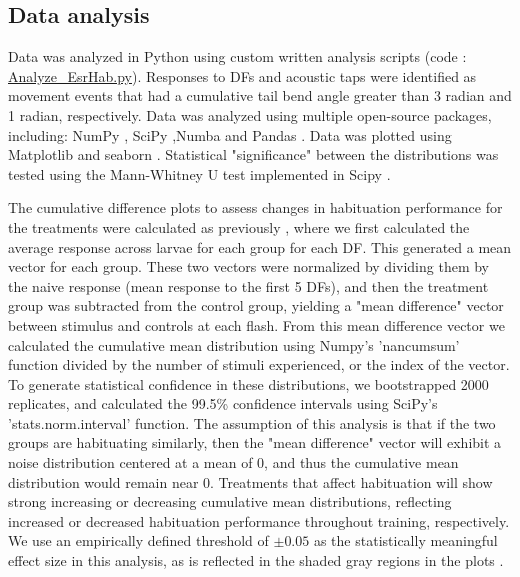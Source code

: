 \documentclass[9pt,lineno]{RandlettLab_elife}
\begin{document}
{\subsection{Data analysis}

Data was analyzed in Python using custom written analysis scripts (code : \href{https://github.com/owenrandlett/2025_HabEstrogen/blob/main/code/Analyze_EsrHab.py}{Analyze\_EsrHab.py}). 
Responses to DFs and acoustic taps were identified as movement events that had a cumulative tail bend angle greater than 3 radian and 1 radian, respectively. Data was analyzed using multiple open-source packages, including: NumPy \citep{Harris2020-bg}, SciPy \citep{Virtanen2020-sz},Numba \citep{lam2015numba} and Pandas \citep{mckinney-proc-scipy-2010}.
Data was plotted using Matplotlib \citep{Hunter2007-ub} and seaborn \citep{Waskom2021-ah}.
Statistical "significance" between the distributions was tested using the Mann-Whitney U test implemented in Scipy \citep{Virtanen2020-sz}.

The cumulative difference plots to assess changes in habituation performance for the treatments were calculated as previously \citep{Randlett2019-fj}, where we first
calculated the average response across larvae for each group for each DF.
This generated a mean vector for each group. 
These two vectors were normalized by dividing them by the naive response (mean response to the first 5 DFs), and then the treatment group was subtracted from the control group, yielding a "mean difference" vector between stimulus and controls at each flash. 
From this mean difference vector we calculated the cumulative mean distribution using Numpy's 'nancumsum' function divided by the number of stimuli experienced, or the index of the vector. 
To generate statistical confidence in these distributions, we bootstrapped 2000 replicates, and calculated the 99.5\% confidence intervals using SciPy's 'stats.norm.interval' function.
The assumption of this analysis is that if the two groups are habituating similarly, then the "mean difference" vector will exhibit a noise distribution centered at a mean of 0, and thus the cumulative mean distribution would remain near 0. 
Treatments that affect habituation will show strong increasing or decreasing cumulative mean distributions, reflecting increased or decreased habituation performance throughout
training, respectively.
We use an empirically defined threshold of $\pm0.05$ as the statistically meaningful effect size in this analysis, as is reflected in the shaded gray regions in the plots \citep{Randlett2019-fj}.

}
\end{document}
